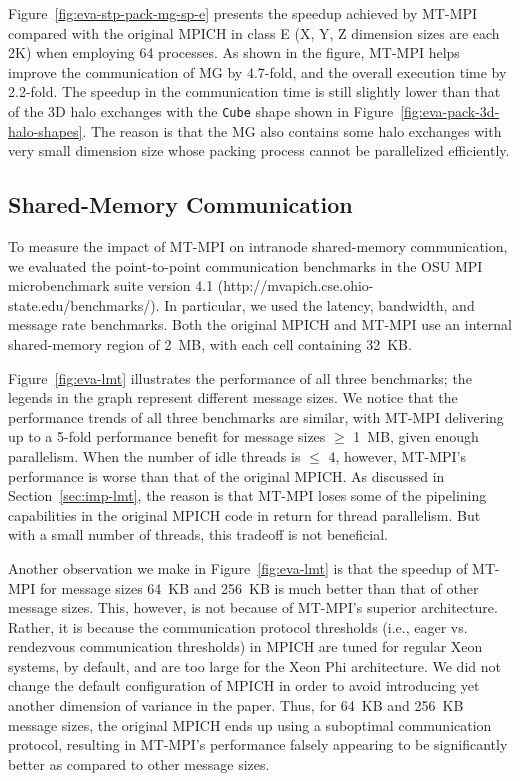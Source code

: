 Figure~\ref{fig:eva-stp-pack-mg-sp-e} presents the speedup achieved by
MT-MPI compared with the original MPICH in class E (X, Y, Z dimension
sizes are each 2K) when employing 64 processes.  As shown in the
figure, MT-MPI helps improve the communication of MG by 4.7-fold, and
the overall execution time by 2.2-fold.  The speedup in the
communication time is still slightly lower than that of the 3D halo
exchanges with the {\tt Cube} shape shown in
Figure~\ref{fig:eva-pack-3d-halo-shapes}.  The reason is that the MG
also contains some halo exchanges with very small dimension size whose
packing process cannot be parallelized efficiently.


\subsection{Shared-Memory Communication}\label{sec:eva-lmt}

To measure the impact of MT-MPI on intranode shared-memory
communication, we evaluated the point-to-point communication benchmarks
in the OSU MPI microbenchmark suite version 4.1
(http://mvapich.cse.ohio-state.edu/benchm\-arks/).  In
particular, we used the latency, bandwidth, and message rate
benchmarks.  Both the original MPICH and MT-MPI use an internal
shared-memory region of 2~MB, with each cell containing 32~KB.

Figure~\ref{fig:eva-lmt} illustrates the performance of all three
benchmarks; the legends in the graph represent different message
sizes.  We notice that the performance trends of all three benchmarks
are similar, with MT-MPI delivering up to a 5-fold performance benefit
for message sizes $\ge$ 1~MB, given enough parallelism.  When the
number of idle threads is $\le$ 4, however, MT-MPI's performance is
worse than that of the original MPICH.  As discussed in
Section~\ref{sec:imp-lmt}, the reason is that MT-MPI loses some of the
pipelining capabilities in the original MPICH code in return for
thread parallelism.  But with a small number of threads, this tradeoff
is not beneficial.

Another observation we make in Figure~\ref{fig:eva-lmt} is that the
speedup of MT-MPI for message sizes 64~KB and 256~KB is much better
than that of other message sizes.  This, however, is not because of
MT-MPI's superior architecture.  Rather, it is because the
communication protocol thresholds (i.e., eager vs. rendezvous
communication thresholds) in MPICH are tuned for regular Xeon systems,
by default, and are too large for the Xeon Phi architecture.  We did
not change the default configuration of MPICH in order to avoid
introducing yet another dimension of variance in the paper.  Thus, for
64~KB and 256~KB message sizes, the original MPICH ends up using a
suboptimal communication protocol, resulting in MT-MPI's performance
falsely appearing to be significantly better as compared to other
message sizes.


